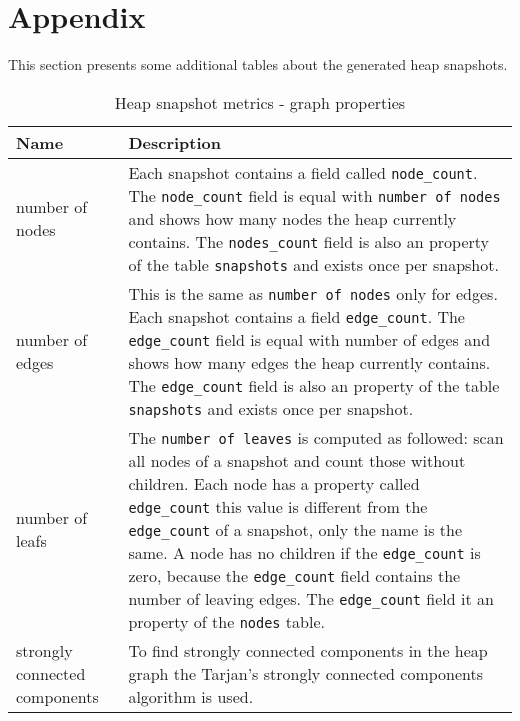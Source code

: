 \section{Appendix}

This section presents some additional tables about the generated heap snapshots.

\begin{table}[!htbp]
	\small
	\centering
	\begin{tabular}{|p{1.5cm}||p{5.5cm}|}
		\hline
		\textbf{Name}	&	\textbf{Description}				\\ \hline \hline
		number of nodes & Each snapshot contains a field 
						  called \texttt{node\_count}.  			
						  The \texttt{node\_count} field is equal 
						  with \texttt{number of nodes} and			
						  shows how many nodes the heap currently 
						  contains. The \texttt{nodes\_count} 			
						  field is also an property of the table
						  \texttt{snapshots} and exists once		
						  per snapshot.								\\ \hline
		number of edges	& This is the same as \texttt{number of nodes} 
						  only for edges. Each snapshot 			
						  contains a field \texttt{edge\_count}. 
						  The \texttt{edge\_count} field is 		
						  equal with number of edges and shows how 
						  many edges the heap currently 			
						  contains. The \texttt{edge\_count} field 
						  is also an property of the table 			
						  \texttt{snapshots} and exists once per 
						  snapshot.									\\ \hline
		number of leafs	& The \texttt{number of leaves} is computed 
						  as followed: scan all nodes of a 			
						  snapshot and count those without children. 
						  Each node has a property called 			
						  \texttt{edge\_count} this value is 
						  different from the \texttt{edge\_count} 	
						  of a snapshot, only the name is the same. 
						  A node has no children if the 			
						  \texttt{edge\_count} is zero, because the
						  \texttt{edge\_count} field 				
						  contains the number of leaving edges. The
						  \texttt{edge\_count} field it 			
						  an property of the \texttt{nodes} table.	\\ \hline
		strongly connected components
						& To find strongly connected components in 
						  the heap graph the Tarjan's 				 
						  strongly connected components
			 			  algorithm\cite{Trajan} is used.			\\ \hline
	\end{tabular}
	\caption{Heap snapshot metrics - graph properties}
	\label{tap:heap_snapshot_metrics_graph}
\end{table}	

